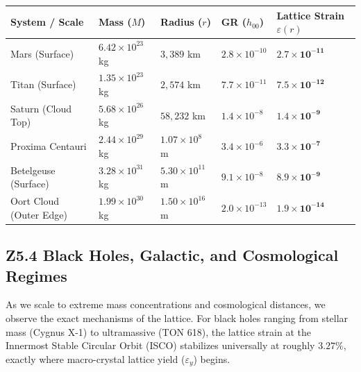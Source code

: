 \documentclass[11pt, letterpaper, openany]{book}
\begin{document}
\begin{center}
\renewcommand{\arraystretch}{1.2}
\small
\begin{tabular}{|p{3.8cm}|p{2cm}|p{2.2cm}|p{2cm}|p{2.5cm}|}
\hline
\rowcolor{kishblue!12}
\textbf{System / Scale} & \textbf{Mass ($M$)} & \textbf{Radius ($r$)} & \textbf{GR ($h_{00}$)} & \textbf{Lattice Strain $\varepsilon(r)$} \\
\hline
Mars (Surface) & $6.42 \times 10^{23}$ kg & $3,389$ km & $2.8 \times 10^{-10}$ & $\mathbf{2.7 \times 10^{-11}}$ \\
\hline
Titan (Surface) & $1.35 \times 10^{23}$ kg & $2,574$ km & $7.7 \times 10^{-11}$ & $\mathbf{7.5 \times 10^{-12}}$ \\
\hline
Saturn (Cloud Top) & $5.68 \times 10^{26}$ kg & $58,232$ km & $1.4 \times 10^{-8}$ & $\mathbf{1.4 \times 10^{-9}}$ \\
\hline
Proxima Centauri & $2.44 \times 10^{29}$ kg & $1.07 \times 10^8$ m & $3.4 \times 10^{-6}$ & $\mathbf{3.3 \times 10^{-7}}$ \\
\hline
Betelgeuse (Surface) & $3.28 \times 10^{31}$ kg & $5.30 \times 10^{11}$ m & $9.1 \times 10^{-8}$ & $\mathbf{8.9 \times 10^{-9}}$ \\
\hline
Oort Cloud (Outer Edge) & $1.99 \times 10^{30}$ kg & $1.50 \times 10^{16}$ m & $2.0 \times 10^{-13}$ & $\mathbf{1.9 \times 10^{-14}}$ \\
\hline
\end{tabular}
\end{center}

\subsection*{Z5.4 Black Holes, Galactic, and Cosmological Regimes}

As we scale to extreme mass concentrations and cosmological distances, we observe the exact mechanisms of the lattice. For black holes ranging from stellar mass (Cygnus X-1) to ultramassive (TON 618), the lattice strain at the Innermost Stable Circular Orbit (ISCO) stabilizes universally at roughly $3.27\%$, exactly where macro-crystal lattice yield ($\varepsilon_y$) begins.
\end{document}
